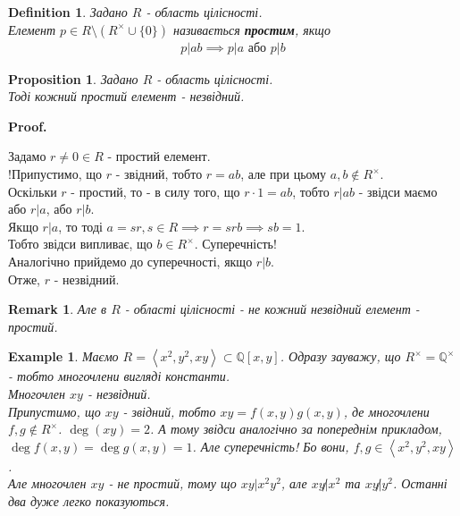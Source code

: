 \documentclass[a4paper, 14pt]{extarticle}
\makeatletter
\theoremstyle{theoremdd}
\theoremstyle{theoremdd}
\newtheorem{definition}[theorem]{Definition}
\theoremstyle{theoremdd}
\theoremstyle{theoremdd}
\newtheorem{example}[theorem]{Example}
\theoremstyle{theoremdd}
\newtheorem{proposition}[theorem]{Proposition}
\theoremstyle{theoremdd}
\newtheorem{remark}[theorem]{Remark}
\theoremstyle{theoremdd}
\theoremstyle{theoremdd}
\def\qed{$\blacksquare$}
\renewenvironment{proof}[1][Proof.\\]{\par
\pushQED{\hfill \qed}%
\normalfont \topsep6\p@\@plus6\p@\relax
\trivlist
\item\relax
{\bfseries
#1\@addpunct{.}}\hspace\labelsep\ignorespaces
}{%
\popQED\endtrivlist\@endpefalse
}
\makeatother
\begin{document}
\begin{definition}
Задано $R$ - область цілісності.\\
Елемент $p \in R \setminus (R^\times \cup \{0\})$ називається \textbf{простим}, якщо
\begin{align*}
p | ab \implies p | a \text{ або } p | b
\end{align*}
\end{definition}

\begin{proposition}
Задано $R$ - область цілісності.\\
Тоді кожний простий елемент - незвідний.
\end{proposition}

\begin{proof}
Задамо $r \neq 0 \in R$ - простий елемент.\\
!Припустимо, що $r$ -  звідний, тобто $r = ab$, але при цьому $a,b \not\in R^\times$.\\
Оскільки $r$ - простий, то - в силу того, що $r \cdot 1 = ab$, тобто $r | ab$ - звідси маємо або $r|a$, або $r|b$.\\
Якщо $r|a$, то тоді $a = sr, s \in R \implies r = srb \implies sb=1$.\\
Тобто звідси випливає, що $b \in R^\times$. Суперечність!\\
Аналогічно прийдемо до суперечності, якщо $r|b$.\\
Отже, $r$ - незвідний.
\end{proof}

\begin{remark}
Але в $R$ - області цілісності - не кожний незвідний елемент - простий.
\end{remark}

\begin{example}
Маємо $R = \left<x^2,y^2,xy \right> \subset \mathbb{Q}[x,y]$. Одразу зауважу, що $R^\times = \mathbb{Q}^\times$ - тобто многочлени вигляді константи.\\
Многочлен $xy$ - незвідний.\\
Припустимо, що $xy$ - звідний, тобто $xy = f(x,y)g(x,y)$, де многочлени $f,g \not\in R^\times$. $\deg (xy) = 2$. А тому звідси аналогічно за попереднім прикладом, $\deg f(x,y) = \deg g(x,y) = 1$. Але суперечність! Бо вони, $f,g \in \left< x^2,y^2, xy\right>$.\\
Але многочлен $xy$ - не простий, тому що $xy | x^2y^2$, але $xy \not| x^2$ та $xy \not| y^2$. Останні два дуже легко показуються.
\end{example}
\end{document}
